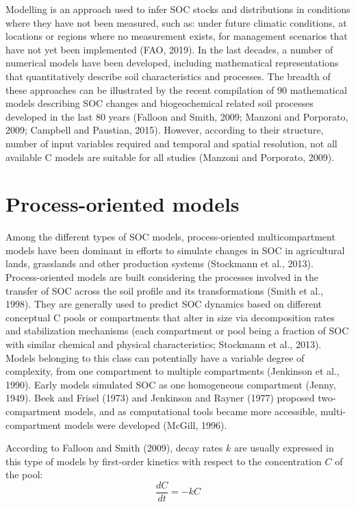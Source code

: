 \documentclass[
  10pt,
  b5paper,
]{book}
\begin{document}
Modelling is an approach used to infer SOC stocks and distributions in conditions where they have not been measured, such as: under future climatic conditions, at locations or regions where no measurement exists, for management scenarios that have not yet been implemented (FAO, 2019). In the last decades, a number of numerical models have been developed, including mathematical representations that quantitatively describe soil characteristics and processes. The breadth of these approaches can be illustrated by the recent compilation of 90 mathematical models describing SOC changes and biogeochemical related soil processes developed in the last 80 years (Falloon and Smith, 2009; Manzoni and Porporato, 2009; Campbell and Paustian, 2015). However, according to their structure, number of input variables required and temporal and spatial resolution, not all available C models are suitable for all studies (Manzoni and Porporato, 2009).

\hypertarget{process-oriented-models}{%
\section{Process-oriented models}\label{process-oriented-models}}

Among the different types of SOC models, process-oriented multicompartment models have been dominant in efforts to simulate changes in SOC in agricultural lands, grasslands and other production systems (Stockmann et al., 2013).
Process-oriented models are built considering the processes involved in the transfer of SOC across the soil profile and its transformations (Smith et al., 1998). They are generally used to predict SOC dynamics based on different conceptual C pools or compartments that alter in size via decomposition rates and stabilization mechanisms (each compartment or pool being a fraction of SOC with similar chemical and physical characteristics; Stockmann et al., 2013). Models belonging to this class can potentially have a variable degree of complexity, from one compartment to multiple compartments (Jenkinson et al., 1990). Early models simulated SOC as one homogeneous compartment (Jenny, 1949). Beek and Frisel (1973) and Jenkinson and Rayner (1977) proposed two-compartment models, and as computational tools became more accessible, multi-compartment models were developed (McGill, 1996).

According to Falloon and Smith (2009), decay rates \(k\) are usually expressed in this type of models by first-order kinetics with respect to the concentration \(C\) of the pool:\\
\begin{equation}
\tag{3.1}
\frac{dC}{dt} =- kC     
\end{equation}
\end{document}
